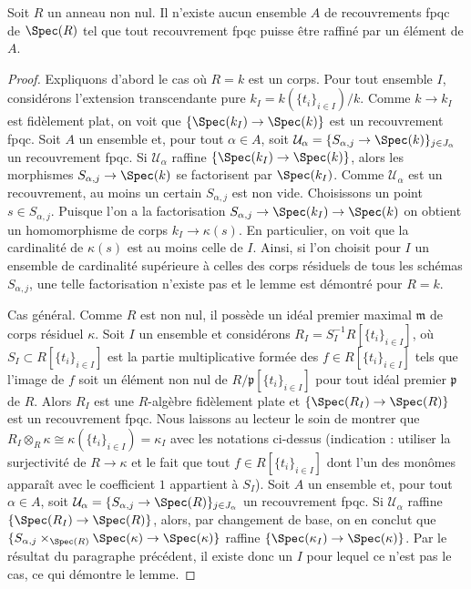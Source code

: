 \begin{lemma}
\label{lemma-no-set-of-fpqc-covers-is-initial}
Soit $R$ un anneau non nul. Il n'existe aucun ensemble $A$ de
recouvrements fpqc de $\Spec(R)$ tel que tout recouvrement fpqc puisse
être raffiné par un élément de $A$.
\end{lemma}

\begin{proof}
Expliquons d'abord le cas où $R = k$ est un corps. Pour tout ensemble $I$, considérons
l'extension transcendante pure
$k_I = k(\{t_i\}_{i \in I})/k$. Comme $k \to k_I$ est fidèlement plat,
on voit que $\{\Spec(k_I) \to \Spec(k)\}$ est un recouvrement fpqc.
Soit $A$ un ensemble et, pour tout $\alpha \in A$, soit
$\mathcal{U}_\alpha = \{S_{\alpha, j} \to \Spec(k)\}_{j \in J_\alpha}$ un
recouvrement fpqc. Si $\mathcal{U}_\alpha$ raffine $\{\Spec(k_I) \to \Spec(k)\}$,
alors les morphismes $S_{\alpha, j} \to \Spec(k)$ se factorisent par
$\Spec(k_I)$. Comme $\mathcal{U}_\alpha$ est un recouvrement,
au moins un certain $S_{\alpha, j}$ est non vide. Choisissons un
point $s \in S_{\alpha, j}$. Puisque l'on a la factorisation
$S_{\alpha, j} \to \Spec(k_I) \to \Spec(k)$
on obtient un homomorphisme de corps $k_I \to \kappa(s)$.
En particulier, on voit que la cardinalité de $\kappa(s)$
est au moins celle de $I$. Ainsi, si l'on choisit pour $I$ un ensemble
de cardinalité supérieure à celles des corps résiduels
de tous les schémas $S_{\alpha, j}$, une telle factorisation
n'existe pas et le lemme est démontré pour $R = k$.

\medskip\noindent
Cas général. Comme $R$ est non nul, il possède un idéal premier maximal
$\mathfrak m$ de corps résiduel $\kappa$. Soit $I$ un ensemble et
considérons $R_I = S_I^{-1} R[\{t_i\}_{i \in I}]$,
où $S_I \subset R[\{t_i\}_{i \in I}]$ est la partie multiplicative
formée des $f \in R[\{t_i\}_{i \in I}]$ tels que l'image de $f$ soit
un élément non nul de $R/\mathfrak p[\{t_i\}_{i \in I}]$ pour
tout idéal premier $\mathfrak p$ de $R$. Alors $R_I$ est une $R$-algèbre
fidèlement plate et $\{\Spec(R_I) \to \Spec(R)\}$ est un
recouvrement fpqc. Nous laissons au lecteur le soin de montrer que
$R_I \otimes_R \kappa \cong \kappa(\{t_i\}_{i \in I}) = \kappa_I$
avec les notations ci-dessus (indication : utiliser la surjectivité de $R \to \kappa$
et le fait que tout $f \in R[\{t_i\}_{i \in I}]$ dont l'un des monômes apparaît
avec le coefficient $1$ appartient à $S_I$). Soit $A$ un ensemble et,
pour tout $\alpha \in A$, soit
$\mathcal{U}_\alpha = \{S_{\alpha, j} \to \Spec(R)\}_{j \in J_\alpha}$ un
recouvrement fpqc. Si $\mathcal{U}_\alpha$ raffine $\{\Spec(R_I) \to \Spec(R)\}$,
alors, par changement de base, on en conclut que
$\{S_{\alpha, j} \times_{\Spec(R)} \Spec(\kappa) \to \Spec(\kappa)\}$
raffine $\{\Spec(\kappa_I) \to \Spec(\kappa)\}$.
Par le résultat du paragraphe précédent, il existe donc un $I$
pour lequel ce n'est pas le cas, ce qui démontre le lemme.
\end{proof}












